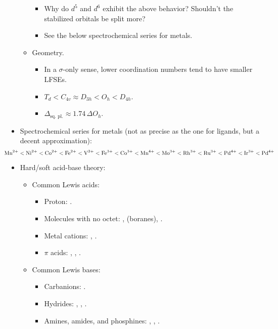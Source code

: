 \documentclass[../notes.tex]{subfiles}
\begin{document}
\begin{itemize}
\begin{itemize}
\begin{itemize}
            \item Why do $d^5$ and $d^6$ exhibit the above behavior? Shouldn't the stabilized orbitals be split more?
            \item See the below spectrochemical series for metals.
        \end{itemize}
        \item Geometry.
        \begin{itemize}
            \item In a $\sigma$-only sense, lower coordination numbers tend to have smaller LFSEs.
            \item $T_d<C_{4v}\approx D_{3h}<O_h<D_{4h}$.
            \item $\Delta_\text{sq. pl.}\approx 1.74\, \Delta O_h$.
        \end{itemize}
    \end{itemize}
    \item Spectrochemical series for metals (not as precise as the one for ligands, but a decent approximation):
    \begin{equation*}\hspace{-3em}
        \ce{Mn^2+} < \ce{Ni^2+}
        < \ce{Co^2+}
        < \ce{Fe^2+}
        < \ce{V^2+}
        < \ce{Fe^3+}
        < \ce{Co^3+}
        < \ce{Mn^4+}
        < \ce{Mo^3+}
        < \ce{Rh^3+}
        < \ce{Ru^3+}
        < \ce{Pd^4+}
        < \ce{Ir^3+}
        < \ce{Pd^4+}
    \end{equation*}
    \item Hard/soft acid-base theory:
    \begin{itemize}
        \item Common Lewis acids:
        \begin{itemize}
            \item Proton: .
            \item Molecules with no octet: ,  (boranes), .
            \item Metal cations: , .
            \item $\pi$ acids: , , .
        \end{itemize}
        \item Common Lewis bases:
        \begin{itemize}
            \item Carbanions: .
            \item Hydrides: , , .
            \item Amines, amides, and phosphines: , , .

\end{itemize}
\end{itemize}
\end{itemize}
\end{document}
